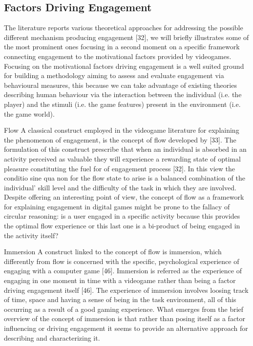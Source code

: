 \subsection{Factors Driving Engagement}
\label{factors_engagement}
The literature reports various theoretical approaches  for addressing the possible different mechanism producing engagement [32], we will briefly illustrates some of the most prominent ones focusing in a second moment on a specific framework connecting engagement to the motivational factors provided by videogames. Focusing on the motivational factors driving engagement is a well suited ground for building a methodology aiming to assess and evaluate engagement via behavioural measures, this because we can take advantage of existing theories describing human behaviour via the interaction between the individual (i.e. the player) and the stimuli (i.e. the game features) present in the environment (i.e. the game world).

Flow
A classical construct employed in the videogame literature for explaining the phenomenon of engagement, is the concept of flow developed by [33]. The formulation of this construct prescribe that when an individual is absorbed in an activity perceived as valuable they will experience a rewarding state of optimal pleasure constituting the fuel for of  engagement process [32]. In this view the conditio sine qua non for the flow state to arise is a balanced combination of the individual’ skill level and the difficulty of the task in which they are involved. Despite offering an interesting point of view, the concept of flow as a framework for explaining engagement in digital games might be prone to the fallacy of circular reasoning: is a user engaged in a specific activity because this provides the optimal flow experience or this last one is a bi-product of being engaged in the activity itself? 

Immersion
A construct linked to the concept of flow is immersion, which differently from flow is concerned with the specific, psychological experience of engaging with a computer game [46]. Immersion is referred as the experience of engaging in one moment in time with a videogame rather than being a factor driving engagement itself [46]. The experience of immersion involves loosing track of time, space and having a sense of being in the task environment, all of this occurring as a result of a good gaming experience. What emerges from the brief overview of the concept of immersion is that rather than posing itself as a factor influencing or driving engagement it seems to provide an alternative approach for describing and characterizing it.

